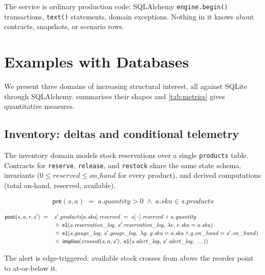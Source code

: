 \documentclass[11pt,a4paper]{article}
\begin{document}
The service is ordinary production code: SQLAlchemy
\texttt{engine.begin()} transactions, \texttt{text()} statements,
domain exceptions.  Nothing in it knows about contracts, snapshots, or
scenario rows.

\section{Examples with Databases}\label{sec:examples}

We present three domains of increasing structural interest, all
against SQLite through SQLAlchemy.   summarises
their shapes and \cref{tab:metrics} gives quantitative measures.

\subsection{Inventory: deltas and conditional telemetry}

The inventory domain models stock reservations over a single
\texttt{products} table.  Contracts for \texttt{reserve},
\texttt{release}, and \texttt{restock} share the same state schema,
invariants ($0 \leq \mathit{reserved} \leq \mathit{on\_hand}$ for
every product), and derived computations (total on-hand, reserved,
available).

\[
\mathsf{pre}(s, a) \;=\; a.\mathit{quantity} > 0 \;\wedge\; a.\mathit{sku} \in s.\mathit{products}
\]

\[
\mathsf{post}(s, a, r, s') \;=\;
\begin{array}[t]{l}
s'.\mathit{products}[a.\mathit{sku}].\mathit{reserved}
  \;=\; s[\,\cdot\,].\mathit{reserved} + a.\mathit{quantity} \\[2pt]
{}\wedge\; \mathsf{e1}(s.\mathit{reservation\_log},\, s'.\mathit{reservation\_log},\,
      \lambda e.\; e.\mathit{sku} = a.\mathit{sku}) \\[2pt]
{}\wedge\; \mathsf{e1}(s.\mathit{gauge\_log},\, s'.\mathit{gauge\_log},\;
      \lambda g.\; g.\mathit{sku}=a.\mathit{sku} \land g.\mathit{on\_hand}=s'.\mathit{on\_hand}) \\[2pt]
{}\wedge\; \mathsf{implies}(\mathit{crossed}(s,a,s'),\;
      \mathsf{e1}(s.\mathit{alert\_log},\, s'.\mathit{alert\_log},\;
        \ldots))
\end{array}
\]

The alert is edge-triggered: available stock crosses from above the
reorder point to at-or-below it.
\end{document}
